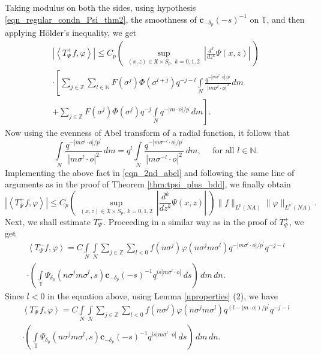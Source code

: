 \documentclass[12pt,reqno]{amsart}
\newcommand{\N}{\mathbb N}
\newcommand{\T}{\mathbb{T}}
\theoremstyle{definition}
\theoremstyle{definition}
\numberwithin{equation}{section}
\begin{document}
Taking modulus on both the sides, using hypothesis \eqref{eqn_regular_condn_Psi_thm2}, the smoothness of $\mathbf{c}_{-\delta_{p}}(-s)^{-1}$ on $\T$, and then applying H\"older's inequality,  we get
\begin{multline}\label{eqn_2nd_abel} 
	\left|	\left\langle T_{\Psi}^{+}f, \varphi\right\rangle\right| \leq C_{p}  \left(~\sup\limits_{(x,z)\in\mathfrak{X}\times S_{p},~k=0,1,2}~\left|\frac{d^{k}}{dz^{k}}\Psi(x,z)\right|~\right)   \\  \cdot \left[\sum\limits_{j\in\mathbb{Z} } \sum\limits_{l \in \N }   F(\sigma^{j})   \varPhi(\sigma^{l+j})  q^{-j-l}
	 \int\limits_{N} \frac{q^{-|m \sigma^{l}\cdot o|/p^{\prime}}}{|m\sigma^l\cdot o |^2} dm \right.\\
	 \left. + \sum\limits_{j\in\mathbb{Z} }  F(\sigma^{j})   \varPhi(\sigma^{j})  q^{-j}  \int\limits_{N} q^{-|m\cdot o|/p^{\prime}} dm\right].
\end{multline}
Now using the evenness of  Abel transform of a radial function, it follows that  
$$\int\limits_{N}\frac{q^{-|m \sigma^{l}\cdot o|/p^{\prime}}}{|m\sigma^l\cdot o |^2} \, dm= q^{l} \int\limits_{N}\frac{q^{-|m \sigma^{-l}\cdot o|/p^{\prime}}}{|m\sigma^{-l}\cdot o |^2} \, dm, \quad \text{ for all } l\in \N.$$
Implementing the above fact in \eqref{eqn_2nd_abel} and following the same line of arguments as in the proof of Theorem \ref{thm:tpsi_plus_bdd}, we finally obtain
$$\left|	\left\langle T_{\Psi}^{+}f, \varphi\right\rangle\right| \leq C_{p} \left(~\sup\limits_{(x,z)\in\mathfrak{X}\times S_{p},~k=0,1,2}~\left|\frac{d^{k}}{dz^{k}}\Psi(x,z)\right|~\right)   \|f\|_{L^p(NA)} \|\varphi\|_{L^{p^{\prime}}(NA)}.$$
Next, we shall estimate $T_\Psi^-$. Proceeding in a similar way as in the proof of $T_{\Psi}^{+}$, we get
\begin{multline*}
	\left\langle T_{\Psi}^{-}f, \varphi\right\rangle = C \int\limits_{N}  \int\limits_{N} \sum\limits_{j\in\mathbb{Z} } \sum\limits_{l<0}   f(n\sigma^{j})  \varphi(n\sigma^j m \sigma^{l})q^{-|m \sigma^{l}\cdot o|/p^{\prime}}q^{-j-l}\\
	\cdot \left(\int\limits_{\mathbb{T}}\Psi_{\delta_{p}}(n\sigma^j m \sigma^{l},s)\mathbf{c}_{-\delta_{p}}(-s)^{-1} q^{is| m\sigma^{l}\cdot o|}~ds\right) \,dm\,dn.
\end{multline*}
Since $l<0$ in the equation above, using Lemma \eqref{nproperties} (2), we have
 \begin{multline*}
	\left\langle T_{\Psi}^{-}f, \varphi\right\rangle = C \int\limits_{N}  \int\limits_{N} \sum\limits_{j\in\mathbb{Z} } \sum\limits_{l<0}   f(n\sigma^{j})  \varphi(n\sigma^j m \sigma^{l})q^{(l-|m\cdot o|)/p^{\prime}}q^{-j-l}\\
	\cdot \left(\int\limits_{\mathbb{T}}\Psi_{\delta_{p}}(n\sigma^j m \sigma^{l},s)\mathbf{c}_{-\delta_{p}}(-s)^{-1} q^{is| m\sigma^{l}\cdot o|}~ds\right) \,dm\,dn.
\end{multline*}
\end{document}
